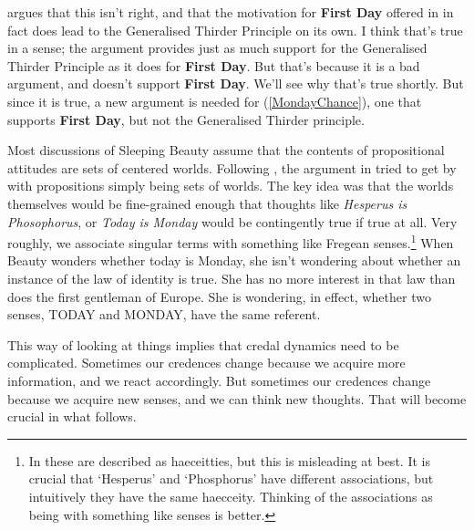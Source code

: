 \citet{Ross2012} argues that this isn't right, and that the motivation for \textbf{First Day} offered in \citet{Weatherson-SoSB} in fact does lead to the Generalised Thirder Principle on its own. I think that's true in a sense; the argument provides just as much support for the Generalised Thirder Principle as it does for \textbf{First Day}. But that's because it is a bad argument, and doesn't support \textbf{First Day}. We'll see why that's true shortly. But since it is true, a new argument is needed for (\ref{MondayChance}), one that supports \textbf{First Day}, but not the Generalised Thirder principle.

Most discussions of Sleeping Beauty assume that the contents of propositional attitudes are sets of centered worlds. Following \citet{Stalnaker2008}, the argument in \citet{Weatherson-SoSB} tried to get by with propositions simply being sets of worlds. The key idea was that the worlds themselves would be fine-grained enough that thoughts like \textit{Hesperus is Phosophorus}, or \textit{Today is Monday} would be contingently true if true at all. Very roughly, we associate singular terms with something like Fregean senses.\footnote{In \citet{Weatherson-SoSB} these are described as haeceitties, but this is misleading at best. It is crucial that `Hesperus' and `Phosphorus' have different associations, but intuitively they have the same haecceity. Thinking of the associations as being with something like senses is better.} When Beauty wonders whether today is Monday, she isn't wondering about whether an instance of the law of identity is true. She has no more interest in that law than does the first gentleman of Europe. She is wondering, in effect, whether two senses, TODAY and MONDAY, have the same referent.

This way of looking at things implies that credal dynamics need to be complicated. Sometimes our credences change because we acquire more information, and we react accordingly. But sometimes our credences change because we acquire new senses, and we can think new thoughts. That will become crucial in what follows.


